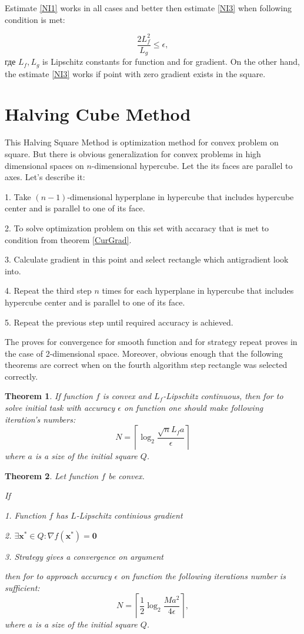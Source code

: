 \documentclass[12pt]{article}
\newtheorem{theorem}{Theorem}[section]
\begin{document}
Estimate \ref{NI1} works in all cases and better then estimate \ref{NI3} when following condition is met:

$$\frac{2L_f^2}{L_g}\leq \epsilon,$$
где $L_f, L_g$ is Lipschitz constants for function and for gradient. On the other hand, the estimate \ref{NI3} works if point with zero gradient exists in the square. 

\section{Halving Cube Method}

This Halving Square Method is optimization method for convex problem on square. But there is obvious generalization for convex problems in high dimensional spaces on $n$-dimensional hypercube. Let the its faces are parallel to axes. Let's describe it:

1. Take $(n-1)$-dimensional hyperplane in hypercube that includes hypercube center and is parallel to one of its face.

2. To solve optimization problem on this set with accaracy that is met to condition from theorem \ref{CurGrad}.

3. Calculate gradient in this point and select rectangle which antigradient look into.

4. Repeat the third step $n$ times for each hyperplane in hypercube that includes hypercube center and is parallel to one of its face.

5. Repeat the previous step until required accuracy is achieved.

The proves for convergence for smooth function and for strategy repeat proves in the case of 2-dimensional space. Moreover, obvious enough that the following theorems are correct when on the fourth algorithm step rectangle was selected correctly.

\begin{theorem}
If function $f$ is convex and $L_f$-Lipschitz continuous, then for to solve initial task with accuracy $\epsilon$ on function one should make following iteration's numbers:
\begin{equation}\label{NI1}N = \left\lceil\log_2\frac{\sqrt{n}L_fa}{\epsilon}\right\rceil\end{equation}
where $a$ is a size of the initial square $Q$.
\end{theorem}

\begin{theorem}
Let function $f$ be convex.

If

1. Function $f$ has $L$-Lipschitz continious gradient

2. $\exists \textbf{x}^*\in Q: \nabla f(\textbf{x}^*) = \textbf{0}$

3. Strategy gives a convergence on argument

then for to approach accuracy $\epsilon$ on function the following iterations number is sufficient:
\begin{equation}\label{NI3}N = \left\lceil\frac{1}{2}\log_2\frac{Ma^2}{4\epsilon}\right\rceil,\end{equation}
where $a$ is a size of the initial square $Q$.
\end{theorem}
\end{document}
